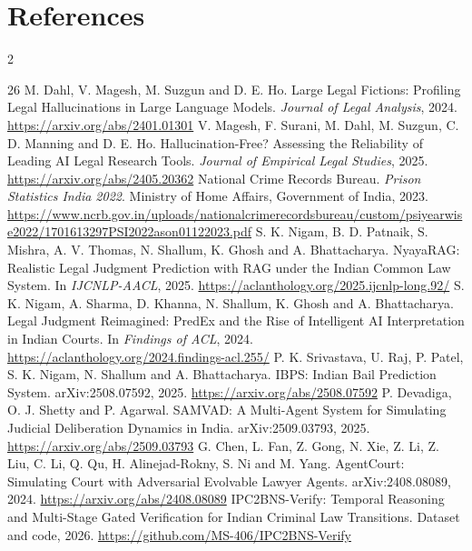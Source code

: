 \documentclass[10pt,a4paper]{article}
\begin{document}
\section*{References}
\begingroup
\footnotesize
\renewcommand{\section}[2]{}%
\setlength{\columnsep}{1.2em}
\begin{multicols}{2}
\begin{thebibliography}{26}
\setlength{\itemsep}{0.5pt}\setlength{\parsep}{0pt}
 M. Dahl, V. Magesh, M. Suzgun and D. E. Ho. Large Legal Fictions: Profiling Legal Hallucinations in Large Language Models. \emph{Journal of Legal Analysis}, 2024. \url{https://arxiv.org/abs/2401.01301}
 V. Magesh, F. Surani, M. Dahl, M. Suzgun, C. D. Manning and D. E. Ho. Hallucination-Free? Assessing the Reliability of Leading AI Legal Research Tools. \emph{Journal of Empirical Legal Studies}, 2025. \url{https://arxiv.org/abs/2405.20362}
 National Crime Records Bureau. \emph{Prison Statistics India 2022}. Ministry of Home Affairs, Government of India, 2023. \url{https://www.ncrb.gov.in/uploads/nationalcrimerecordsbureau/custom/psiyearwise2022/1701613297PSI2022ason01122023.pdf}
 S. K. Nigam, B. D. Patnaik, S. Mishra, A. V. Thomas, N. Shallum, K. Ghosh and A. Bhattacharya. NyayaRAG: Realistic Legal Judgment Prediction with RAG under the Indian Common Law System. In \emph{IJCNLP-AACL}, 2025. \url{https://aclanthology.org/2025.ijcnlp-long.92/}
 S. K. Nigam, A. Sharma, D. Khanna, N. Shallum, K. Ghosh and A. Bhattacharya. Legal Judgment Reimagined: PredEx and the Rise of Intelligent AI Interpretation in Indian Courts. In \emph{Findings of ACL}, 2024. \url{https://aclanthology.org/2024.findings-acl.255/}
 P. K. Srivastava, U. Raj, P. Patel, S. K. Nigam, N. Shallum and A. Bhattacharya. IBPS: Indian Bail Prediction System. arXiv:2508.07592, 2025. \url{https://arxiv.org/abs/2508.07592}
 P. Devadiga, O. J. Shetty and P. Agarwal. SAMVAD: A Multi-Agent System for Simulating Judicial Deliberation Dynamics in India. arXiv:2509.03793, 2025. \url{https://arxiv.org/abs/2509.03793}
 G. Chen, L. Fan, Z. Gong, N. Xie, Z. Li, Z. Liu, C. Li, Q. Qu, H. Alinejad-Rokny, S. Ni and M. Yang. AgentCourt: Simulating Court with Adversarial Evolvable Lawyer Agents. arXiv:2408.08089, 2024. \url{https://arxiv.org/abs/2408.08089}
 IPC2BNS-Verify: Temporal Reasoning and Multi-Stage Gated Verification for Indian Criminal Law Transitions. Dataset and code, 2026. \url{https://github.com/MS-406/IPC2BNS-Verify}

\end{thebibliography}
\end{multicols}
\end{document}
